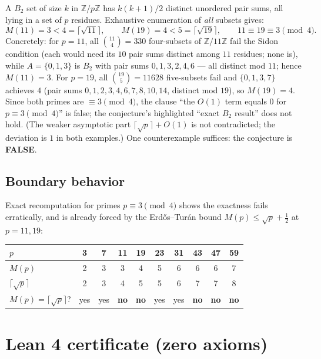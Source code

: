 \documentclass[11pt]{article}
\begin{document}
A $B_2$ set of size $k$ in $\mathbb{Z}/p\mathbb{Z}$ has $k(k+1)/2$ distinct
unordered pair sums, all lying in a set of $p$ residues.  Exhaustive enumeration
of \emph{all} subsets gives:
\[
M(11)=3<4=\lceil\sqrt{11}\rceil,\qquad M(19)=4<5=\lceil\sqrt{19}\rceil,
\qquad 11\equiv 19\equiv 3\pmod 4 .
\]
Concretely: for $p=11$, all $\binom{11}{4}=330$ four-subsets of
$\mathbb{Z}/11\mathbb{Z}$ fail the Sidon condition (each would need its
$10$ pair sums distinct among $11$ residues; none is), while
$A=\{0,1,3\}$ is $B_2$ with pair sums $0,1,3,2,4,6$ --- all distinct mod $11$;
hence $M(11)=3$.  For $p=19$, all $\binom{19}{5}=11628$ five-subsets fail and
$\{0,1,3,7\}$ achieves $4$ (pair sums $0,1,2,3,4,6,7,8,10,14$, distinct mod
$19$), so $M(19)=4$.  Since both primes are $\equiv3\pmod4$,
the clause ``the $O(1)$ term equals $0$ for $p\equiv3\pmod4$'' is false; the
conjecture's highlighted ``exact $B_2$ result'' does not hold.  (The weaker
asymptotic part $\lceil\sqrt p\rceil+O(1)$ is not contradicted; the deviation is
$1$ in both examples.)  One counterexample suffices: the conjecture is
\textbf{FALSE}.

\subsection*{Boundary behavior}

Exact recomputation for primes $p\equiv3\pmod4$ shows the exactness fails
erratically, and is already forced by the Erd\H{o}s--Tur\'an bound
$M(p)\le\sqrt p+\tfrac12$ at $p=11,19$:
\begin{center}
\begin{tabular}{lccccccccc}
\toprule
$p$ & 3 & 7 & 11 & 19 & 23 & 31 & 43 & 47 & 59\\
\midrule
$M(p)$ & 2 & 3 & 3 & 4 & 5 & 6 & 6 & 6 & 7\\
$\lceil\sqrt p\rceil$ & 2 & 3 & 4 & 5 & 5 & 6 & 7 & 7 & 8\\
$M(p)=\lceil\sqrt p\rceil$? & yes & yes & \textbf{no} & \textbf{no} & yes & yes
  & \textbf{no} & \textbf{no} & \textbf{no}\\
\bottomrule
\end{tabular}
\end{center}

\section{Lean 4 certificate (zero axioms)}
\end{document}
